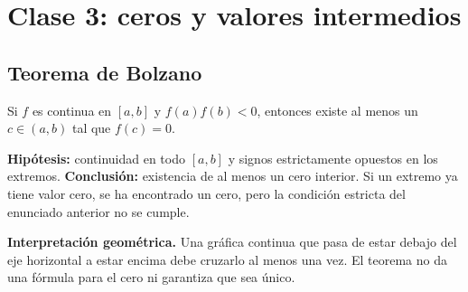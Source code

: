\documentclass[10pt,a5paper]{article}
\begin{document}
\section*{Clase 3: ceros y valores intermedios}
\subsection*{Teorema de Bolzano}

\begin{teorema}[de Bolzano]
Si $f$ es continua en $[a,b]$ y $f(a)f(b)<0$, entonces existe al menos un $c\in(a,b)$ tal que $f(c)=0$.
\end{teorema}

\textbf{Hipótesis:} continuidad en todo $[a,b]$ y signos estrictamente opuestos en los extremos. \textbf{Conclusión:} existencia de al menos un cero interior. Si un extremo ya tiene valor cero, se ha encontrado un cero, pero la condición estricta del enunciado anterior no se cumple.

\textbf{Interpretación geométrica.} Una gráfica continua que pasa de estar debajo del eje horizontal a estar encima debe cruzarlo al menos una vez. El teorema no da una fórmula para el cero ni garantiza que sea único.

\begin{center}
\end{center}
\end{document}
